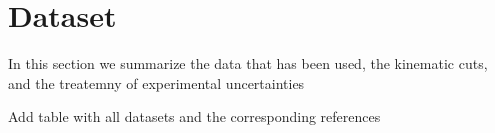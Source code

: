 
\section{Dataset}

In this section we summarize the data that has been used, the
kinematic cuts, and the treatemny of experimental
uncertainties

Add table with all datasets and the corresponding references
